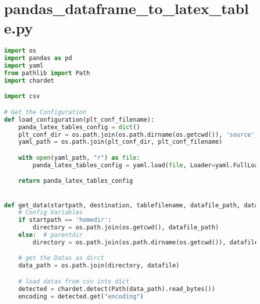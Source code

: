 
\section{pandas\_dataframe\_to\_latex\_table.py}
\lstset{style=gra_codestyle}
\begin{lstlisting}[language=python, caption=Python LaTex - pandas\_dataframe\_to\_latex\_table.py CSV - LaTex Tabelle,captionpos=b,label={lst:Python LaTex - pandas_dataframe_to_latex_table},breaklines=true]
import os
import pandas as pd
import yaml
from pathlib import Path
import chardet

import csv

# Get the Configuration
def load_configuration(plt_conf_filename):
    panda_latex_tables_config = dict()
    plt_conf_dir = os.path.join(os.path.dirname(os.getcwd()), 'source', 'configuration')
    yaml_path = os.path.join(plt_conf_dir, plt_conf_filename)

    with open(yaml_path, "r") as file:
        panda_latex_tables_config = yaml.load(file, Loader=yaml.FullLoader)

    return panda_latex_tables_config


def get_data(startpath, destination, tablefilename, datafile_path, datafile, alternative_cvs_load, separator, decimal):
    # Config Variables
    if startpath == 'homedir':
        directory = os.path.join(os.getcwd(), datafile_path)
    else:  # parentdir
        directory = os.path.join(os.path.dirname(os.getcwd()), datafile_path)

    # get the Datas as dirct
    data_path = os.path.join(directory, datafile)

    # load datas from csv into dict
    detected = chardet.detect(Path(data_path).read_bytes())
    encoding = detected.get("encoding")


\end{lstlisting}
